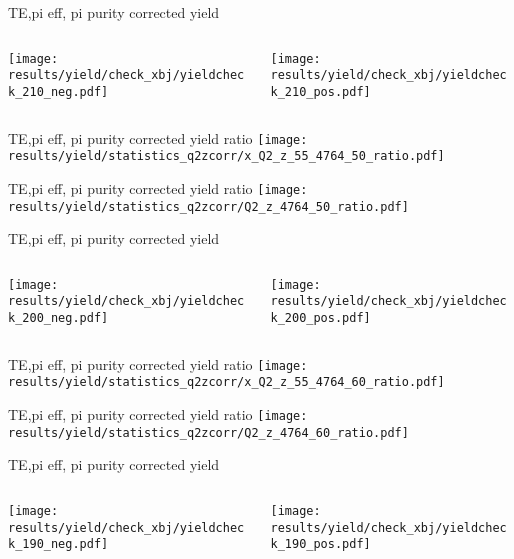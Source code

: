 \begin{frame}{TE,pi eff, pi purity corrected yield}
\begin{columns}
\begin{column}[T]{0.5\textwidth}
\texttt{[image: results/yield/check\_xbj/yieldcheck\_210\_neg.pdf]}
\end{column}
\begin{column}[T]{0.5\textwidth}
\texttt{[image: results/yield/check\_xbj/yieldcheck\_210\_pos.pdf]}
\end{column}
\end{columns}
\end{frame}
\begin{frame}{TE,pi eff, pi purity corrected yield ratio}
\texttt{[image: results/yield/statistics\_q2zcorr/x\_Q2\_z\_55\_4764\_50\_ratio.pdf]}
\end{frame}
\begin{frame}{TE,pi eff, pi purity corrected yield ratio}
\texttt{[image: results/yield/statistics\_q2zcorr/Q2\_z\_4764\_50\_ratio.pdf]}
\end{frame}
\begin{frame}{TE,pi eff, pi purity corrected yield}
\begin{columns}
\begin{column}[T]{0.5\textwidth}
\texttt{[image: results/yield/check\_xbj/yieldcheck\_200\_neg.pdf]}
\end{column}
\begin{column}[T]{0.5\textwidth}
\texttt{[image: results/yield/check\_xbj/yieldcheck\_200\_pos.pdf]}
\end{column}
\end{columns}
\end{frame}
\begin{frame}{TE,pi eff, pi purity corrected yield ratio}
\texttt{[image: results/yield/statistics\_q2zcorr/x\_Q2\_z\_55\_4764\_60\_ratio.pdf]}
\end{frame}
\begin{frame}{TE,pi eff, pi purity corrected yield ratio}
\texttt{[image: results/yield/statistics\_q2zcorr/Q2\_z\_4764\_60\_ratio.pdf]}
\end{frame}
\begin{frame}{TE,pi eff, pi purity corrected yield}
\begin{columns}
\begin{column}[T]{0.5\textwidth}
\texttt{[image: results/yield/check\_xbj/yieldcheck\_190\_neg.pdf]}
\end{column}
\begin{column}[T]{0.5\textwidth}
\texttt{[image: results/yield/check\_xbj/yieldcheck\_190\_pos.pdf]}
\end{column}
\end{columns}
\end{frame}
